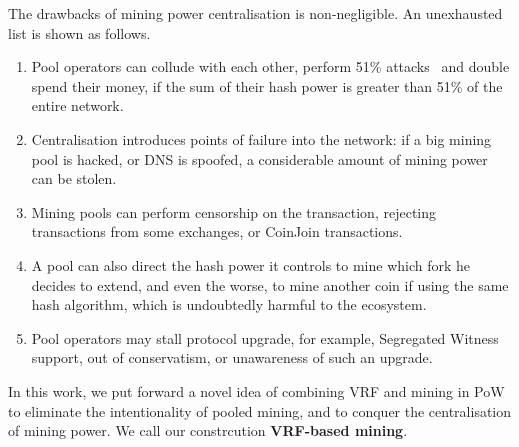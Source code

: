The drawbacks of mining power centralisation is non-negligible.
An unexhausted list is shown as follows.
\begin{enumerate}
    \item Pool operators can collude with each other, perform 51\% attacks~\cite{} and double spend their money, if the sum of their hash power is greater than 51\% of the entire network. 
    \item Centralisation introduces points of failure into the network: if a big mining pool is hacked, or DNS is spoofed, a considerable amount of mining power can be stolen.
    \item Mining pools can perform censorship on the transaction, rejecting transactions from some exchanges, or CoinJoin transactions.
    \item A pool can also direct the hash power it controls to mine which fork he decides to extend, and even the worse, to mine another coin if using the same hash algorithm, which is undoubtedly harmful to the ecosystem.
    \item Pool operators may stall protocol upgrade, for example, Segregated Witness~\cite{segwit} support, out of conservatism, or unawareness of such an upgrade.
\end{enumerate}

In this work, we put forward a novel idea of combining VRF and mining in PoW to eliminate the intentionality of pooled mining, and to conquer the centralisation of mining power. We call our constrcution \textbf{VRF-based mining}.
